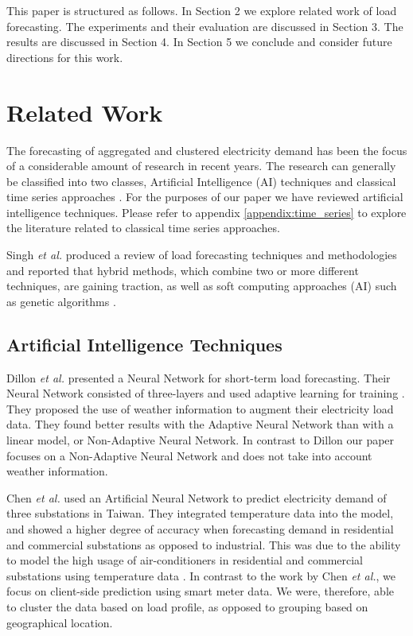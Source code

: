 This paper is structured as follows. In Section 2 we explore related work of load forecasting. The experiments and their evaluation are discussed in Section 3. The results are discussed in Section 4. In Section 5 we conclude and consider future directions for this work.

\section{Related Work}

The forecasting of aggregated and clustered electricity demand has been the focus of a considerable amount of research in recent years. The research can generally be classified into two classes, Artificial Intelligence (AI) techniques \cite{Kim2000, Tiong2008,Quilumba2014} and classical time series approaches \cite{Nazarko2005ARIMAApproach,Huang2003,Nguyen2017}. For the purposes of our paper we have reviewed artificial intelligence techniques. Please refer to appendix \ref{appendix:time_series} to explore the literature related to classical time series approaches.

Singh \textit{et al.} produced a review of load forecasting techniques and methodologies and reported that hybrid methods, which combine two or more different techniques, are gaining traction, as well as soft computing approaches (AI) such as genetic algorithms \cite{Singh2012}.

\subsection{Artificial Intelligence Techniques}

Dillon \textit{et al.} presented a Neural Network for short-term load forecasting. Their Neural Network consisted of three-layers and used adaptive learning for training \cite{Dillon1991}. They proposed the use of weather information to augment their electricity load data. They found better results with the Adaptive Neural Network than with a linear model, or Non-Adaptive Neural Network. In contrast to Dillon our paper focuses on a Non-Adaptive Neural Network and does not take into account weather information.

Chen \textit{et al.} used an Artificial Neural Network to predict electricity demand of three substations in Taiwan. They integrated temperature data into the model, and showed a higher degree of accuracy when forecasting demand in residential and commercial substations as opposed to industrial. This was due to the ability to model the high usage of air-conditioners in residential and commercial substations using temperature data \cite{Chen1996}. In contrast to the work by Chen \textit{et al.}, we focus on client-side prediction using smart meter data. We were, therefore, able to cluster the data based on load profile, as opposed to grouping based on geographical location.


